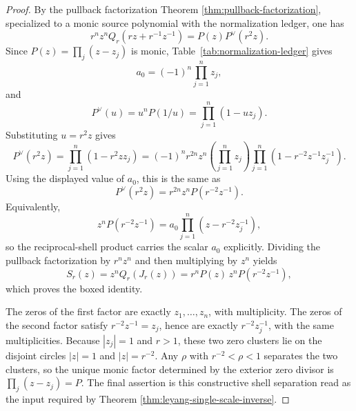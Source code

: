 \begin{proof}
By the pullback factorization Theorem \ref{thm:pullback-factorization}, specialized to a monic source polynomial with the normalization ledger, one has
\[
r^n z^n Q_r\!\left(rz+r^{-1}z^{-1}\right)=P(z)P^{\vee}(r^2z).
\]
Since \(P(z)=\prod_j(z-z_j)\) is monic, Table~\ref{tab:normalization-ledger} gives
\[
a_0=(-1)^n\prod_{j=1}^{n}z_j,
\]
and
\[
P^{\vee}(u)=u^nP(1/u)=\prod_{j=1}^{n}(1-uz_j).
\]
Substituting \(u=r^2z\) gives
\[
P^{\vee}(r^2z)=\prod_{j=1}^{n}(1-r^2zz_j)
=(-1)^n r^{2n}z^n\left(\prod_{j=1}^{n}z_j\right)\prod_{j=1}^{n}\left(1-r^{-2}z^{-1}z_j^{-1}\right).
\]
Using the displayed value of \(a_0\), this is the same as
\[
P^{\vee}(r^2z)=r^{2n}z^nP\!\left(r^{-2}z^{-1}\right).
\]
Equivalently,
\[
z^nP(r^{-2}z^{-1})
=a_0\prod_{j=1}^{n}(z-r^{-2}z_j^{-1}),
\]
so the reciprocal-shell product carries the scalar \(a_0\) explicitly.
Dividing the pullback factorization by \(r^nz^n\) and then multiplying by \(z^n\) yields
\[
S_r(z)=z^nQ_r(J_r(z))=r^nP(z)\,z^nP\!\left(r^{-2}z^{-1}\right),
\]
which proves the boxed identity.

The zeros of the first factor are exactly \(z_1,\dots,z_n\), with multiplicity.  The zeros of the second factor satisfy \(r^{-2}z^{-1}=z_j\), hence are exactly \(r^{-2}z_j^{-1}\), with the same multiplicities.  Because \(|z_j|=1\) and \(r>1\), these two zero clusters lie on the disjoint circles \(|z|=1\) and \(|z|=r^{-2}\).  Any \(\rho\) with \(r^{-2}<\rho<1\) separates the two clusters, so the unique monic factor determined by the exterior zero divisor is \(\prod_j(z-z_j)=P\).  The final assertion is this constructive shell separation read as the input required by Theorem \ref{thm:leyang-single-scale-inverse}.
\end{proof}
